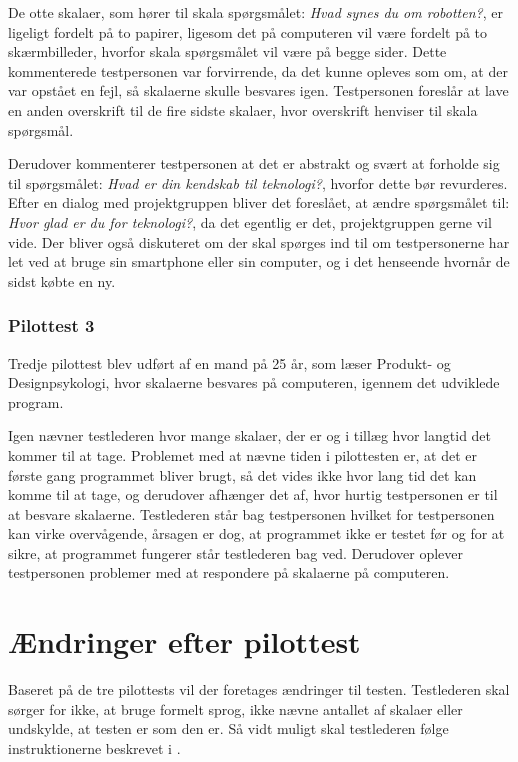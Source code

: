 De otte skalaer, som hører til skala spørgsmålet: \textit{Hvad synes du om robotten?}, er ligeligt fordelt på to papirer, ligesom det på computeren vil være fordelt på to skærmbilleder, hvorfor skala spørgsmålet vil være på begge sider. Dette kommenterede testpersonen var forvirrende, da det kunne opleves som om, at der var opstået en fejl, så skalaerne skulle besvares igen. Testpersonen foreslår at lave en anden overskrift til de fire sidste skalaer, hvor overskrift henviser til skala spørgsmål.

Derudover kommenterer testpersonen at det er abstrakt og svært at forholde sig til spørgsmålet: \textit{Hvad er din kendskab til teknologi?}, hvorfor dette bør revurderes. Efter en dialog med projektgruppen bliver det foreslået, at ændre spørgsmålet til: \textit{Hvor glad er du for teknologi?}, da det egentlig er det, projektgruppen gerne vil vide. Der bliver også diskuteret om der skal spørges ind til om testpersonerne har let ved at bruge sin smartphone eller sin computer, og i det henseende hvornår de sidst købte en ny. 

\subsubsection*{Pilottest 3}
\label{TestAfSkalaerPilot3}
%
Tredje pilottest blev udført af en mand på 25 år, som læser Produkt- og Designpsykologi, hvor skalaerne besvares på computeren, igennem det udviklede program. 

Igen nævner testlederen hvor mange skalaer, der er og i tillæg hvor langtid det kommer til at tage. Problemet med at nævne tiden i pilottesten er, at det er første gang programmet bliver brugt, så det vides ikke hvor lang tid det kan komme til at tage, og derudover afhænger det af, hvor hurtig testpersonen er til at besvare skalaerne. Testlederen står bag testpersonen hvilket for testpersonen kan virke overvågende, årsagen er dog, at programmet ikke er testet før og for at sikre, at programmet fungerer står testlederen bag ved. Derudover oplever testpersonen problemer med at respondere på skalaerne på computeren.   

\section{Ændringer efter pilottest}
\label{TestAfSkalaerAendringerPilot}
%
Baseret på de tre pilottests vil der foretages ændringer til testen. Testlederen skal sørger for ikke, at bruge formelt sprog, ikke nævne antallet af skalaer eller undskylde, at testen er som den er. Så vidt muligt skal testlederen følge instruktionerne beskrevet i .

